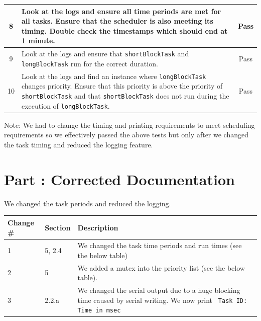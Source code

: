 \documentclass{article}
\newcounter{partNum}
\newcommand{\partNum}{%
        \stepcounter{partNum}%
        \thepartNum}
\newcommand{\sectPart}[1]{\section*{Part \partNum: #1}}
\begin{document}
\begin{center}
\begin{tabular}{| c | p{35em} | c | }
    8 & Look at the logs and ensure all time periods are met for all tasks. Ensure that the scheduler is also meeting its timing. Double check the timestamps which should end at 1 minute. & Pass \\ \hline
    9 & Look at the logs and ensure that \texttt{shortBlockTask} and \texttt{longBlockTask} run for the correct duration. & Pass \\ \hline
    10 & Look at the logs and find an instance where \texttt{longBlockTask} changes priority. Ensure that this priority is above the priority of \texttt{shortBlockTask} and that \texttt{shortBlockTask} does not run during the execution of \texttt{longBlockTask}. & Pass \\ \hline
    \end{tabular}
\end{center}

Note: We had to change the timing and printing requirements to meet scheduling requirements so we effectively passed the above tests but only after we changed the task timing and reduced the logging feature.


\sectPart{Corrected Documentation}

We changed the task periods and reduced the logging.

\begin{center}
	\begin{tabular}{l | l | p{35em}}
		Change \# & Section & Description \\ \hline
		1 & 5, 2.4 & We changed the task time periods and run times (see the below table) \\
		2 & 5 & We added a mutex into the priority list (see the below table). \\
		3 & 2.2.a & We changed the serial output due to a huge blocking time caused by serial writing. We now print
\texttt{ Task ID: Time in msec} \\
	\end{tabular}
\end{center} 
        
\vspace{1em}
\end{document}
